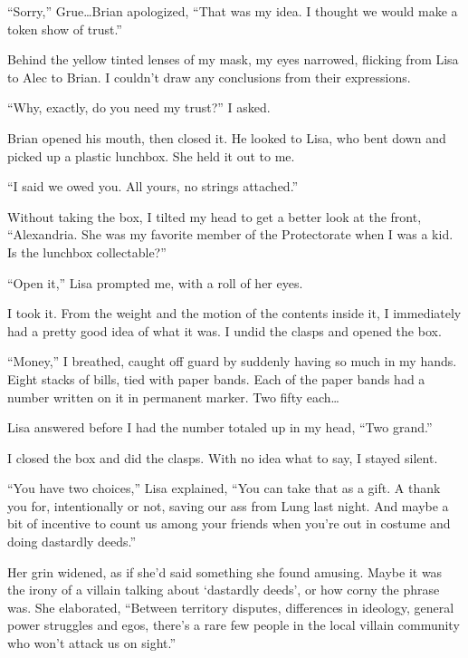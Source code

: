``Sorry,'' Grue\ldots Brian apologized, ``That was my idea.  I thought we would make a token show of trust.''



Behind the yellow tinted lenses of my mask, my eyes narrowed, flicking from Lisa to Alec to Brian.  I couldn't draw any conclusions from their expressions.



``Why, exactly, do you need my trust?'' I asked.



Brian opened his mouth, then closed it.  He looked to Lisa, who bent down and picked up a plastic lunchbox.  She held it out to me.



``I said we owed you.  All yours, no strings attached.''



Without taking the box, I tilted my head to get a better look at the front, ``Alexandria.  She was my favorite member of the Protectorate when I was a kid.  Is the lunchbox collectable?''



``Open it,'' Lisa prompted me, with a roll of her eyes.



I took it.  From the weight and the motion of the contents inside it, I immediately had a pretty good idea of what it was.  I undid the clasps and opened the box.



``Money,'' I breathed, caught off guard by suddenly having so much in my hands.  Eight stacks of bills, tied with paper bands.  Each of the paper bands had a number written on it in permanent marker.  Two fifty each\ldots



Lisa answered before I had the number totaled up in my head, ``Two grand.''



I closed the box and did the clasps.  With no idea what to say, I stayed silent.



``You have two choices,'' Lisa explained, ``You can take that as a gift.  A thank you for, intentionally or not, saving our ass from Lung last night.  And maybe a bit of incentive to count us among your friends when you're out in costume and doing dastardly deeds.''



Her grin widened, as if she'd said something she found amusing.  Maybe it was the irony of a villain talking about `dastardly deeds', or how corny the phrase was.  She elaborated, ``Between territory disputes, differences in ideology, general power struggles and egos, there's a rare few people in the local villain community who won't attack us on sight.''



